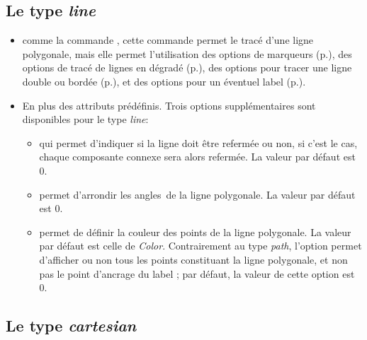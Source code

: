 \subsection{Le type \emph{line}}\label{typeline}

{\centering {}\par}

\begin{itemize}
 \item \desc comme la commande , cette commande permet le tracé d'une ligne polygonale, mais elle permet l'utilisation des options de marqueurs (p.\pageref{marqueurs}), des options de tracé de lignes en dégradé (p.\pageref{gradLines}), des options pour tracer une ligne double ou bordée (p.\pageref{optionsline}), et des options pour un éventuel label (p.\pageref{optionslabels}).
 \item En plus des attributs prédéfinis. Trois options supplémentaires sont disponibles pour le type \emph{line}:
  \begin{itemize}
  \item {} qui permet d'indiquer si la ligne doit être refermée ou non, si c'est le cas, chaque composante connexe sera alors refermée. La valeur par défaut est $0$.
  \item {} permet d'arrondir les \og angles\fg\ de la ligne polygonale. La valeur par défaut est $0$.
  \item {} permet de définir la couleur des points de la ligne polygonale. La valeur par défaut est celle de \emph{Color}. Contrairement au type \emph{path}, l'option  permet d'afficher ou non tous les points constituant la ligne polygonale, et non pas le point d'ancrage du label ; par défaut, la valeur de cette option est $0$.
\end{itemize}
\end{itemize}

\subsection{Le type \emph{cartesian}}\label{typecartesian}

{\centering {}\par}

